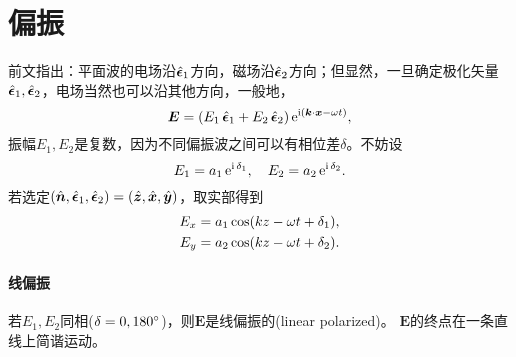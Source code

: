 \section{偏振}
前文指出：平面波的电场沿$\uvec\epsilon_1$方向，磁场沿$\uvec\epsilon_2$方向；但显然，一旦确定极化矢量$\uvec\epsilon_1,\uvec\epsilon_2$，电场当然也可以沿其他方向，一般地，
\[
    \bm E=(E_1\uvec\epsilon_1+E_2\uvec\epsilon_2)\e{\i(\bm k\cdot\bm x-\omega t)},
\]
振幅$E_1,E_2$是复数，因为不同偏振波之间可以有相位差$\delta$。不妨设
\[
    E_1=a_1\e{\i\vd_1},\quad E_2=a_2\e{\i\vd_2}.
\]
若选定$(\uvec n,\uvec\epsilon_1,\uvec\epsilon_2)=(\uvec z,\uvec x,\uvec y)$，取实部得到
\begin{align*}
    E_x&=a_1\cos(kz-\omega t+\vd_1),\\
    E_y&=a_2\cos(kz-\omega t+\vd_2).
\end{align*}
\paragraph{线偏振}
若$E_1,E_2$同相($\vd=0,180\degree$)，则$\bm E$是线偏振的(linear polarized)。%
$\bm E$的终点在一条直线上简谐运动。
\begin{center}
\end{center}
